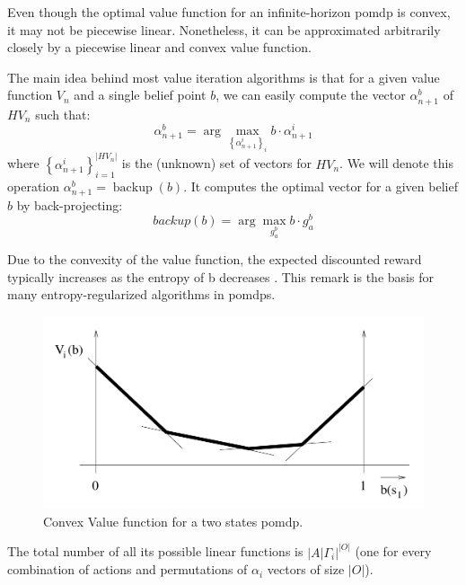 \begin{remark}
    Even though the optimal value function for an infinite-horizon
    \gls{pomdp} is convex, it may not be piecewise linear. Nonetheless, it can be approximated
    arbitrarily closely by a piecewise linear and convex value function.
\end{remark}


The main idea behind most value iteration algorithms is that for a given value function 
\(V_{n}\) and a single belief point \(b\), we can
easily compute the vector \(\alpha_{n+1}^{b}\) of \(H V_{n}\) such that:
$$\alpha_{n+1}^{b}=\arg \max _{\left\{\alpha_{n+1}^{i}\right\}_{i}} b \cdot \alpha_{n+1}^{i}$$    
where \(\left\{\alpha_{n+1}^{i}\right\}_{i=1}^{|H V_{n}|}\) is the (unknown) set of vectors for \(H V_{n}\). 
We will denote this operation
\(\alpha_{n+1}^{b}=\operatorname{backup}(b)\). 
It computes the optimal vector for a given belief \(b\) by back-projecting:
\begin{equation}
    {backup}(b)=\arg\max_{g_a^b} b\cdot g_a^b
    \label{eq:backup}
\end{equation}
        

Due to the convexity of the value function, the expected discounted reward typically increases 
as the entropy of b decreases . This remark is the basis for 
many entropy-regularized algorithms in \gls{pomdp}s.

\begin{figure}
    \centering
    \includegraphics[scale=0.2]{images/pomdp-value.png}
    \caption{Convex Value function for a two states \gls{pomdp}.}
    \label{fig:pomdp-value}
\end{figure}


The total number of all its possible linear functions is $|A|\Gamma_i|^{|O|}$ (one
for every combination of actions and permutations of $\alpha_i$ vectors of size $|O|$). 

